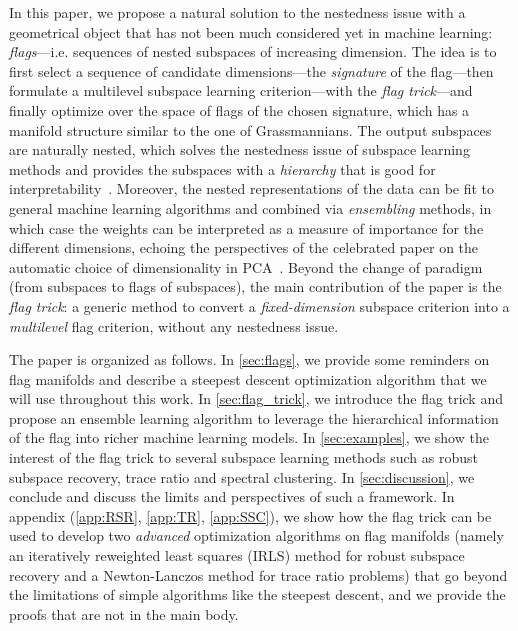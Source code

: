 In this paper, we propose a natural solution to the nestedness issue with a geometrical object that has not been much considered yet in machine learning: \textit{flags}---i.e. sequences of nested subspaces of increasing dimension.
The idea is to first select a sequence of candidate dimensions---the \textit{signature} of the flag---then formulate a multilevel subspace learning criterion---with the \textit{flag trick}---and finally optimize over the space of flags of the chosen signature, which has a manifold structure similar to the one of Grassmannians.
The output subspaces are naturally nested, which solves the nestedness issue of subspace learning methods and provides the subspaces with a \textit{hierarchy} that is good for interpretability~\citep[Section~7]{huber_projection_1985}.
Moreover, the nested representations of the data can be fit to general machine learning algorithms and combined via \textit{ensembling} methods, in which case the weights can be interpreted as a measure of importance for the different dimensions, echoing the perspectives of the celebrated paper on the automatic choice of dimensionality in PCA~\citep{minka_automatic_2000}.
Beyond the change of paradigm (from subspaces to flags of subspaces), the main contribution of the paper is the \textit{flag trick}: a generic method to convert a \textit{fixed-dimension} subspace criterion into a \textit{multilevel} flag criterion, without any nestedness issue.


The paper is organized as follows.
In \autoref{sec:flags}, we provide some reminders on flag manifolds and describe a steepest descent optimization algorithm that we will use throughout this work.
In \autoref{sec:flag_trick}, we introduce the flag trick and propose an ensemble learning algorithm to leverage the hierarchical information of the flag into richer machine learning models.
In \autoref{sec:examples}, we show the interest of the flag trick to several subspace learning methods such as robust subspace recovery, trace ratio and spectral clustering.
In \autoref{sec:discussion}, we conclude and discuss the limits and perspectives of such a framework.
In appendix (\autoref{app:RSR}, \autoref{app:TR}, \autoref{app:SSC}), we show how the flag trick can be used to develop two \textit{advanced} optimization algorithms on flag manifolds (namely an iteratively reweighted least squares (IRLS) method for robust subspace recovery and a Newton-Lanczos method for trace ratio problems) that go beyond the limitations of simple algorithms like the steepest descent, and we provide the proofs that are not in the main body.